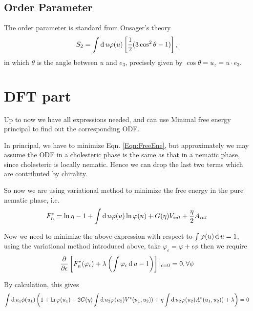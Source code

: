 \subsection{Order Parameter}
The order parameter is standard from Onsager's theory
\begin{equation}
	S_2=\int \operatorname{d}u\varphi(u)\left[\frac{1}{2}(3\cos^2\theta -1)\right],
\end{equation}
in which $\theta$ is the angle between $u$ and $e_3$, precisely given by $\cos\theta = u_z = u\cdot e_3$.

\section{DFT part}\label{Sec:DFT}
Up to now we have all expressions needed, and can use Minimal free energy principal to find out the corresponding ODF.

In principal, we have to minimize Eqn. \ref{Eqn:FreeEne}, but approximately we may assume the ODF in a cholesteric phase is the same as that in a nematic phase, since cholesteric is locally nematic. Hence we can drop the last two terms which are contributed by chirality.

So now we are using variational method to minimize the free energy in the pure nematic phase, i.e.
\begin{equation}
	F_{n}^*=\ln\eta -1+\int\operatorname{d}u\varphi(u)\ln \varphi(u)+G(\eta)V_{int}+\frac{\eta}{2}A_{int}
\end{equation}

Now we need to minimize the above expression with respect to $\int\varphi(u)\operatorname{d}u=1$, using the variational method introduced above, take $\varphi_{\epsilon}=\varphi+\epsilon\phi$ then we require
\begin{equation}
	\frac{\partial}{\partial\epsilon}\left[F_{n}^*(\varphi_{\epsilon})+\lambda\left(\int \varphi_{\epsilon}\operatorname{d}u-1\right)\right]|_{\epsilon=0}=0, \forall \phi
\end{equation}

By calculation, this gives
\begin{equation}
	\int\operatorname{d}u_1\phi(u_1)\left(1+\ln \varphi(u_1)+2G(\eta)\int\operatorname{d}u_2\varphi(u_2)V^*(u_1,u_2))+\eta\int\operatorname{d}u_2\varphi(u_2)A^*(u_1,u_2))+\lambda\right)=0
\end{equation}

